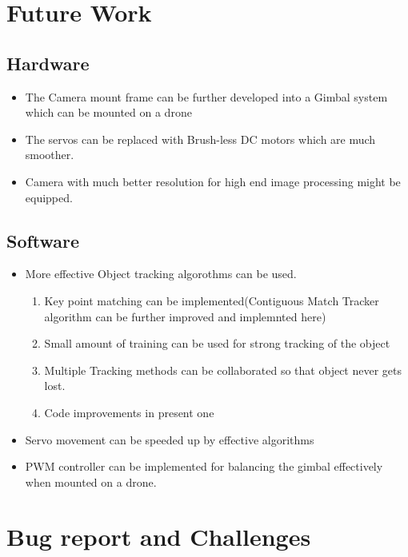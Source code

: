 \documentclass[a4paper,12pt,oneside]{book}
\begin{document}
\section{Future Work}
\subsection{Hardware}
\begin{itemize}
    \item The Camera mount frame can be further developed into a Gimbal system which can be mounted on a drone
    \item The servos can be replaced with Brush-less DC motors which are much smoother.
    \item Camera with much better resolution for high end image processing might be equipped.
\end{itemize}
\subsection{Software}
\begin{itemize}
    \item More effective Object tracking algorothms can be used.
        \begin{enumerate}
            \item Key point matching can be implemented(Contiguous Match Tracker algorithm can be further improved and implemnted here)
            \item Small amount of training can be used for strong tracking of the object
            \item Multiple Tracking methods can be collaborated so that object never gets lost.
            \item Code improvements in present one
        \end{enumerate} 
    \item Servo movement can be speeded up by effective algorithms
    \item PWM controller can be implemented for balancing the gimbal effectively when mounted on a drone.
\end{itemize}
\section{Bug report and Challenges}
\end{document}
